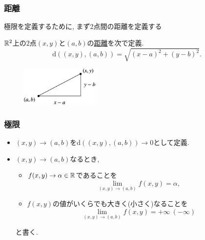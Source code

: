\begin{frame}
\frametitle{距離}

極限を定義するために, まず2点間の距離を定義する

\begin{Def}
$\mathbb{R}^2$上の$2$点$(x,y)$と$(a,b)$の\underline{距離}を次で定義. 
$$
\mathrm{d}((x,y),(a,b))=\sqrt{(x-a)^2+(y-b)^2}. 
$$
\end{Def}

\vspace{-2mm}

\begin{figure}[htbp]
 \begin{center} 
  \includegraphics[width=40mm]{calculus10/dist.png}
 \end{center}
\end{figure}

\vspace{-2mm}

\end{frame}




\begin{frame}
\frametitle{極限}


\begin{Def} \label{極限}
\begin{itemize}
\item $(x,y) \to (a,b)$を$\mathrm{d}((x,y),(a,b)) \to 0$として定義. 
\item $(x,y) \to (a,b)$なるとき, 
 \begin{itemize}
 \item $f(x,y)\to \alpha \in \mathbb{R}$であることを
$$
\lim_{(x,y)\to (a,b)}f(x,y)=\alpha, 
$$
\item  $f(x,y)$の値がいくらでも大きく(小さく)なることを
$$
\lim_{(x,y)\to (a,b)}f(x,y)=+ \infty \ (-\infty)
$$
\end{itemize}
と書く. 
\end{itemize}
\end{Def}

\end{frame}



